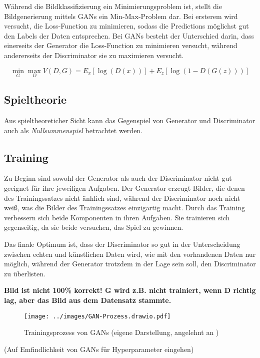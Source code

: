 Während die Bildklassifizierung ein Minimierungsproblem ist, stellt die Bildgenerierung mittels \acp{GAN} ein Min-Max-Problem dar. Bei ersterem wird versucht, die Loss-Function zu minimieren, sodass die Predictions möglichst gut den Labels der Daten entsprechen. Bei \acp{GAN} besteht der Unterschied darin, dass einerseits der Generator die Loss-Function zu minimieren versucht, während andererseits der Discriminator sie zu maximieren versucht.

\begin{equation}
	\min_{G} \max_{D} V(D,G) = E_x[\log(D(x))] + E_z[\log(1-D(G(z)))]
\end{equation}

\subsection{Spieltheorie}
Aus spieltheoreticher Sicht kann das Gegenspiel von Generator und Discriminator auch als \emph{Nullsummenspiel} betrachtet werden.

\subsection{Training}
Zu Beginn sind sowohl der Generator als auch der Discriminator nicht gut geeignet für ihre jeweiligen Aufgaben. Der Generator erzeugt Bilder, die denen des Trainingssatzes nicht änhlich sind, während der Discriminator noch nicht weiß, was die Bilder des Trainingssatzes einzigartig macht. Durch das Training verbessern sich beide Komponenten in ihren Aufgaben. Sie trainieren sich gegenseitig, da sie beide versuchen, das Spiel zu gewinnen.

Das finale Optimum ist, dass der Discriminator so gut in der Unterscheidung zwischen echten und künstlichen Daten wird, wie mit den vorhandenen Daten nur möglich, während der Generator trotzdem in der Lage sein soll, den Discriminator zu überlisten. \cite[S. 656]{visualApproach}

\textbf{Bild ist nicht 100\% korrekt! G wird z.B. nicht trainiert, wenn D richtig lag, aber das Bild aus dem Datensatz stammte.}
\begin{figure}[H]
	\centering
	\texttt{[image: ../images/GAN-Prozess.drawio.pdf]}
	\caption{Trainingsprozess von GANs (eigene Darstellung, angelehnt an \cite[S. 654f.]{visualApproach})}
	\label{fig:gan-trainingsprozess}
\end{figure}

(Auf Emfindlichkeit von GANs für Hyperparameter eingehen)

